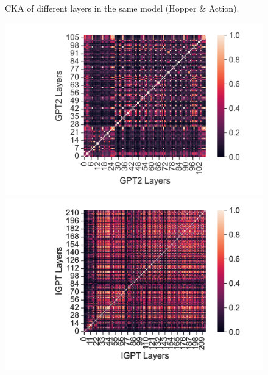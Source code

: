 \documentclass{article}
\begin{document}
\begin{figure}[H]
\begin{minipage}[b]{0.32\linewidth}
    \end{minipage}
    \caption{CKA of different layers in the same model (Hopper \& Action).}
\end{figure}

\begin{figure}[H]
    \centering
    \begin{minipage}[b]{0.32\linewidth}
        \includegraphics[width=\linewidth]{figs/cka_40_40_gpt2gpt2_halfcheetah_medium_666_state.png}
    \end{minipage}
    \begin{minipage}[b]{0.32\linewidth}
        \includegraphics[width=\linewidth]{figs/cka_40_40_igptigpt_halfcheetah_medium_666_state.png}
    \end{minipage}
    \begin{minipage}[b]{0.32\linewidth}

\end{minipage}
\end{figure}
\end{document}
